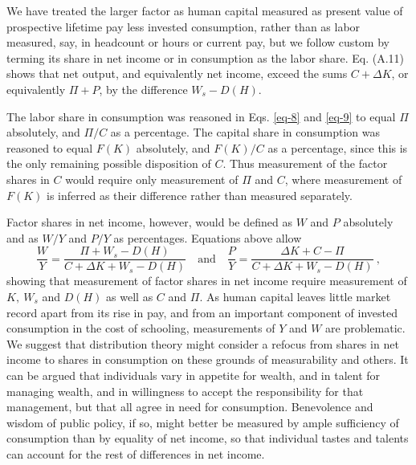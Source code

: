 
We have treated the larger factor as human capital measured as present value of prospective lifetime pay less invested consumption, rather than as labor measured, say, in headcount or hours or current pay, but we follow custom by terming its share in net income or in consumption as the labor share. Eq. (A.11) shows that net output, and equivalently net income, exceed the sums $C + \Delta K$, or equivalently $\Pi + P$, by the difference $W_s - D(H)$.

The labor share in consumption was reasoned in Eqs. \eqref{eq-8} and \eqref{eq-9} to equal $\Pi$ absolutely, and $\Pi / C$ as a percentage. The capital share in consumption was reasoned to equal $F(K)$ absolutely, and $F(K)/C$ as a percentage, since this is the only remaining possible disposition of $C$. Thus measurement of the factor shares in $C$ would require only measurement of $\Pi$ and $C$, where measurement of $F(K)$ is inferred as their difference rather than measured separately.

Factor shares in net income, however, would be defined as $W$ and $P$ absolutely and as $W/Y$ and $P/Y$ as percentages. Equations above allow
\begin{equation}
\frac{W}{Y} = \frac{\Pi + W_s - D(H)}{C + \Delta K + W_s - D(H)} \quad  \text{and} \quad \frac{P}{Y} = \frac{\Delta K + C - \Pi}{C + \Delta K + W_s - D(H)} \ , \label{eq-a13}
\end{equation}
showing that measurement of factor shares in net income require measurement of $K,\ W_s$ and $D(H)$ as well as $C$ and $\Pi$. As human capital leaves little market record apart from its rise in pay, and from an important component of invested consumption in the cost of schooling, measurements of $Y$ and $W$ are problematic. We suggest that distribution theory might consider a refocus from shares in net income to shares in consumption on these grounds of measurability and others. It can be argued that individuals vary in appetite for wealth, and in talent for managing wealth, and in willingness to accept the responsibility for that management, but that all agree in need for consumption. Benevolence and wisdom of public  policy, if so, might better be measured by ample sufficiency of consumption than by equality of net income, so that individual tastes and talents can account for the rest of differences in net income.

